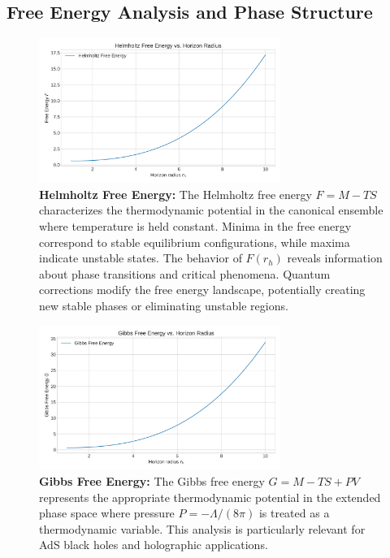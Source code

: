 \documentclass[12pt]{article}
\begin{document}
\subsection{Free Energy Analysis and Phase Structure}

\begin{figure}[H]
    \centering
    \includegraphics[width=0.7\textwidth]{figures/free_energy_vs_rh.png}
    \caption{\textbf{Helmholtz Free Energy:} The Helmholtz free energy $F = M - TS$ characterizes the thermodynamic potential in the canonical ensemble where temperature is held constant. Minima in the free energy correspond to stable equilibrium configurations, while maxima indicate unstable states. The behavior of $F(r_h)$ reveals information about phase transitions and critical phenomena. Quantum corrections modify the free energy landscape, potentially creating new stable phases or eliminating unstable regions.}
    \label{fig:free_energy_vs_rh}
\end{figure}

\begin{figure}[H]
    \centering
    \includegraphics[width=0.7\textwidth]{figures/gibbs_energy_vs_rh.png}
    \caption{\textbf{Gibbs Free Energy:} The Gibbs free energy $G = M - TS + PV$ represents the appropriate thermodynamic potential in the extended phase space where pressure $P = -\Lambda/(8\pi)$ is treated as a thermodynamic variable. This analysis is particularly relevant for AdS black holes and holographic applications.}
    \label{fig:gibbs_energy_vs_rh}
\end{figure}
\end{document}
